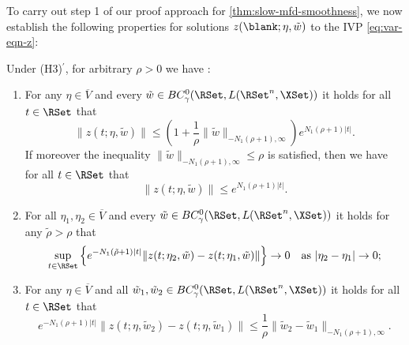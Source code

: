 \documentclass[a4paper]{siamart190516}
\begin{document}
To carry out step 1 of our proof approach for \cref{thm:slow-mfd-smoothness}, we now
establish the following properties for solutions $z(\blank; \eta, \tilde{w})$ to the
IVP \cref{eq:var-eqn-z}:
 \begin{lemma}\label{lem:z-properties}
Under (H3)$^\prime$, for arbitrary $\rho > 0$ we have :
 \begin{enumerate}
 \item For any $\eta \in \overline{V}$ and every $\tilde{w} \in  BC^0_{\gamma}(\RSet, L(\RSet^n, \XSet))$ it holds for all $t \in \RSet$ that
\[
 \|z(t; \eta,\tilde{w})\| \leq  \left( 1 + \frac{1}{\rho}  \|\tilde{w}\|_{-N_1 (\rho+1), \infty}  \right)  e^{N_1(\rho+1)|t|}.
\]
If moreover the inequality $\|\tilde{w}\|_{-N_1 (\rho+1), \infty} \leq \rho$ is satisfied, then we have for all $t \in \RSet$ that
\[
 \|z(t; \eta,\tilde{w})\| \leq e^{N_1(\rho+1)|t|}.
\]
 \item For all $\eta_1, \eta_2 \in  \overline{V}$ and every $\tilde{w} \in  BC^0_{\gamma}(\RSet, L(\RSet^n, \XSet))$  it holds for any $\tilde{\rho} > \rho$ that
  \[
 \sup_{t \in \RSet} \left\{ e^{-N_1(\tilde{\rho}+1)|t|}  \|z(t;\eta_2,\tilde{w}) - z(t;\eta_1,\tilde{w})\| \right\} \rightarrow 0 \quad \text{as } |\eta_2 - \eta_1| \rightarrow 0;
 \]
 \item For any $\eta \in \overline{V}$ and all $\tilde{w}_1,\tilde{w}_2 \in  BC^0_{\gamma}(\RSet, L(\RSet^n, \XSet))$ it holds for all $t \in \RSet$ that
 \[
 e^{-N_1(\rho+1)|t|}  \|z(t;\eta,\tilde{w}_2) - z(t;\eta,\tilde{w}_1)\| \leq \frac{1}{\rho} \| \tilde{w}_2 - \tilde{w}_1\|_{-N_1(\rho+1),\infty}.
 \]
 \end{enumerate}
 \end{lemma}
 
\end{document}
